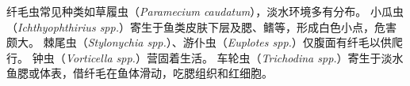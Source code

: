 \documentclass[11pt]{article}
\begin{document}
\newline

纤毛虫常见种类如草履虫（\textit{Paramecium caudatum}），淡水环境多有分布。
小瓜虫（\textit{Ichthyophthirius spp.}）寄生于鱼类皮肤下层及腮、鳍等，形成白色小点，危害颇大。
棘尾虫（\textit{Stylonychia spp.}）、游仆虫（\textit{Euplotes spp.}）仅腹面有纤毛以供爬行。
钟虫（\textit{Vorticella spp.}）营固着生活。
车轮虫（\textit{Trichodina spp.}）寄生于淡水鱼腮或体表，借纤毛在鱼体滑动，吃腮组织和红细胞。
\end{document}
